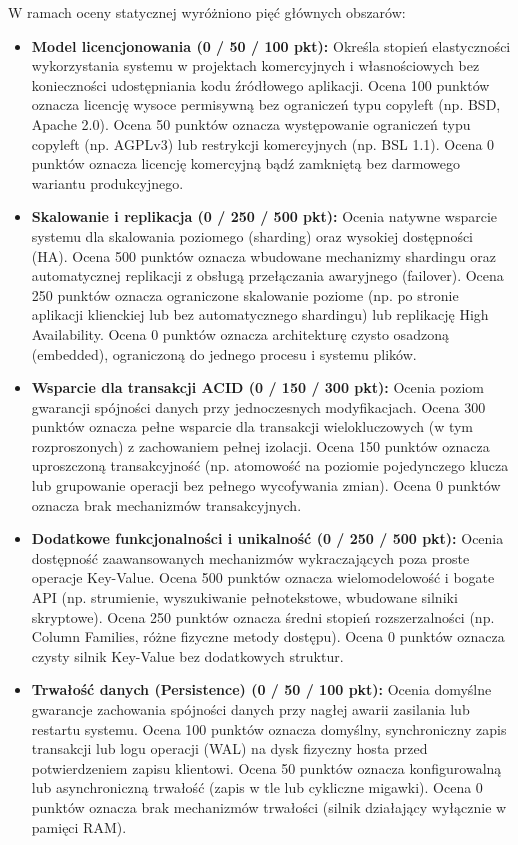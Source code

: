 W ramach oceny statycznej wyróżniono pięć głównych obszarów:
\begin{itemize}
    \item \textbf{Model licencjonowania (0 / 50 / 100 pkt):} Określa stopień elastyczności wykorzystania systemu w projektach komercyjnych i własnościowych bez konieczności udostępniania kodu źródłowego aplikacji. Ocena 100 punktów oznacza licencję wysoce permisywną bez ograniczeń typu copyleft (np. BSD, Apache 2.0). Ocena 50 punktów oznacza występowanie ograniczeń typu copyleft (np. AGPLv3) lub restrykcji komercyjnych (np. BSL 1.1). Ocena 0 punktów oznacza licencję komercyjną bądź zamkniętą bez darmowego wariantu produkcyjnego.
    \item \textbf{Skalowanie i replikacja (0 / 250 / 500 pkt):} Ocenia natywne wsparcie systemu dla skalowania poziomego (sharding) oraz wysokiej dostępności (HA). Ocena 500 punktów oznacza wbudowane mechanizmy shardingu oraz automatycznej replikacji z obsługą przełączania awaryjnego (failover). Ocena 250 punktów oznacza ograniczone skalowanie poziome (np. po stronie aplikacji klienckiej lub bez automatycznego shardingu) lub replikację High Availability. Ocena 0 punktów oznacza architekturę czysto osadzoną (embedded), ograniczoną do jednego procesu i systemu plików.
    \item \textbf{Wsparcie dla transakcji ACID (0 / 150 / 300 pkt):} Ocenia poziom gwarancji spójności danych przy jednoczesnych modyfikacjach. Ocena 300 punktów oznacza pełne wsparcie dla transakcji wielokluczowych (w tym rozproszonych) z zachowaniem pełnej izolacji. Ocena 150 punktów oznacza uproszczoną transakcyjność (np. atomowość na poziomie pojedynczego klucza lub grupowanie operacji bez pełnego wycofywania zmian). Ocena 0 punktów oznacza brak mechanizmów transakcyjnych.
    \item \textbf{Dodatkowe funkcjonalności i unikalność (0 / 250 / 500 pkt):} Ocenia dostępność zaawansowanych mechanizmów wykraczających poza proste operacje Key-Value. Ocena 500 punktów oznacza wielomodelowość i bogate API (np. strumienie, wyszukiwanie pełnotekstowe, wbudowane silniki skryptowe). Ocena 250 punktów oznacza średni stopień rozszerzalności (np. Column Families, różne fizyczne metody dostępu). Ocena 0 punktów oznacza czysty silnik Key-Value bez dodatkowych struktur.
    \item \textbf{Trwałość danych (Persistence) (0 / 50 / 100 pkt):} Ocenia domyślne gwarancje zachowania spójności danych przy nagłej awarii zasilania lub restartu systemu. Ocena 100 punktów oznacza domyślny, synchroniczny zapis transakcji lub logu operacji (WAL) na dysk fizyczny hosta przed potwierdzeniem zapisu klientowi. Ocena 50 punktów oznacza konfigurowalną lub asynchroniczną trwałość (zapis w tle lub cykliczne migawki). Ocena 0 punktów oznacza brak mechanizmów trwałości (silnik działający wyłącznie w pamięci RAM).
\end{itemize}

